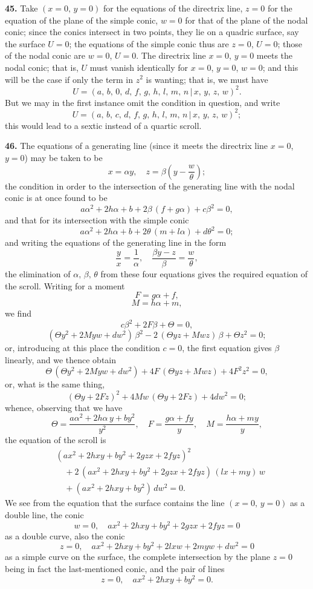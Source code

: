 \documentclass[11pt,a4paper]{article}
\providecommand{\mid}{\,|\,}
\begin{document}
\medskip

\textbf{45.} Take $(x = 0,\,y = 0)$ for the equations of the directrix line, $z = 0$ for the equation of the plane of the simple conic, $w = 0$ for that of the plane of the nodal conic; since the conics intersect in two points, they lie on a quadric surface, say the surface $U = 0$; the equations of the simple conic thus are $z = 0$, $U = 0$; those of the nodal conic are $w = 0$, $U = 0$. The directrix line $x = 0$, $y = 0$ meets the nodal conic; that is, $U$ must vanish identically for $x = 0$, $y = 0$, $w = 0$; and this will be the case if only the term in $z^{2}$ is wanting; that is, we must have
\[
U = (a,\,b,\,0,\,d,\,f,\,g,\,h,\,l,\,m,\,n\mid x,\,y,\,z,\,w)^{2}.
\]
But we may in the first instance omit the condition in question, and write
\[
U = (a,\,b,\,c,\,d,\,f,\,g,\,h,\,l,\,m,\,n\mid x,\,y,\,z,\,w)^{2};
\]
this would lead to a sextic instead of a quartic scroll.

\medskip

\textbf{46.} The equations of a generating line (since it meets the directrix line $x = 0$, $y = 0$) may be taken to be
\[
x = \alpha y,\quad z = \beta\left(y - \frac{w}{\theta}\right);
\]
the condition in order to the intersection of the generating line with the nodal conic is at once found to be
\[
a\alpha^{2} + 2h\alpha + b + 2\beta\,(f + g\alpha) + c\beta^{2} = 0,
\]
and that for its intersection with the simple conic
\[
a\alpha^{2} + 2h\alpha + b + 2\theta\,(m + l\alpha) + d\theta^{2} = 0;
\]
and writing the equations of the generating line in the form
\[
\frac{y}{x} = \frac{1}{\alpha},\quad \frac{\beta y - z}{\beta} = \frac{w}{\theta},
\]
the elimination of $\alpha,\,\beta,\,\theta$ from these four equations gives the required equation of the scroll. Writing for a moment
\[
F = g\alpha + f,
\]
\[
M = h\alpha + m,
\]
we find
\[
c\beta^{2} + 2F\beta + \Theta = 0,
\]
\[
(\Theta y^{2} + 2Myw + dw^{2})\,\beta^{2} - 2\,(\Theta yz + Mwz)\,\beta + \Theta z^{2} = 0;
\]
or, introducing at this place the condition $c = 0$, the first equation gives $\beta$ linearly, and we thence obtain
\[
\Theta\,(\Theta y^{2} + 2Myw + dw^{2}) + 4F\,(\Theta yz + Mwz) + 4F^{2}z^{2} = 0,
\]
or, what is the same thing,
\[
(\Theta y + 2Fz)^{2} + 4Mw\,(\Theta y + 2Fz) + 4dw^{2} = 0;
\]
whence, observing that we have
\[
\Theta = \frac{a\alpha^{2} + 2h\alpha\,y + by^{2}}{y^{2}},\quad F = \frac{g\alpha + fy}{y},\quad M = \frac{h\alpha + my}{y},
\]
the equation of the scroll is
\begin{align*}
&(ax^{2} + 2hxy + by^{2} + 2gzx + 2fyz)^{2}\\
&\quad + 2\,(ax^{2} + 2hxy + by^{2} + 2gzx + 2fyz)\,(lx + my)\,w\\
&\quad + (ax^{2} + 2hxy + by^{2})\,dw^{2} = 0.
\end{align*}
We see from the equation that the surface contains the line $(x = 0,\,y = 0)$ as a double line, the conic
\[
w = 0,\quad ax^{2} + 2hxy + by^{2} + 2gzx + 2fyz = 0
\]
as a double curve, also the conic
\[
z = 0,\quad ax^{2} + 2hxy + by^{2} + 2lxw + 2myw + dw^{2} = 0
\]
as a simple curve on the surface, the complete intersection by the plane $z = 0$ being in fact the last-mentioned conic, and the pair of lines
\[
z = 0,\quad ax^{2} + 2hxy + by^{2} = 0.
\]
\end{document}
